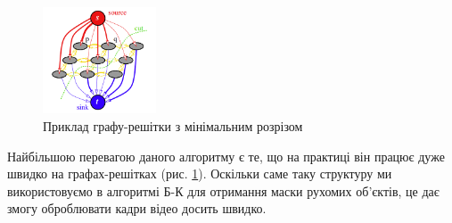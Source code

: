 \begin{figure}[h]
    \centering
    \includegraphics[width=0.3\textwidth]{images/graph_cut}
    \caption{Приклад графу-решітки з мінімальним розрізом \cite{bib:boykov_kolmogorov}
        \label{fig:graph_lattice}
    }
\end{figure}
Найбільшою перевагою даного алгоритму є те, що на практиці він працює дуже швидко на графах-решітках
(рис. \ref{fig:graph_lattice}).
Оскільки саме таку структуру ми використовуємо в алгоритмі Б-К для отримання маски рухомих
об'єктів, це дає змогу оброблювати кадри відео досить швидко.
